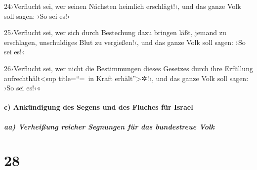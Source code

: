24›Verflucht sei, wer seinen Nächsten heimlich erschlägt!‹, und das
ganze Volk soll sagen: ›So sei es!‹

25›Verflucht sei, wer sich durch Bestechung dazu bringen läßt, jemand zu
erschlagen, unschuldiges Blut zu vergießen!‹, und das ganze Volk soll
sagen: ›So sei es!‹

26›Verflucht sei, wer nicht die Bestimmungen dieses Gesetzes durch ihre
Erfüllung aufrechthält\textless sup title=``=~in Kraft
erhält''\textgreater✲!‹, und das ganze Volk soll sagen: ›So sei es!‹«

\hypertarget{c-ankuxfcndigung-des-segens-und-des-fluches-fuxfcr-israel}{%
\paragraph{c) Ankündigung des Segens und des Fluches für
Israel}\label{c-ankuxfcndigung-des-segens-und-des-fluches-fuxfcr-israel}}

\hypertarget{aa-verheiuxdfung-reicher-segnungen-fuxfcr-das-bundestreue-volk}{%
\subparagraph{aa) Verheißung reicher Segnungen für das bundestreue
Volk}\label{aa-verheiuxdfung-reicher-segnungen-fuxfcr-das-bundestreue-volk}}

\hypertarget{section-27}{%
\section{28}\label{section-27}}

